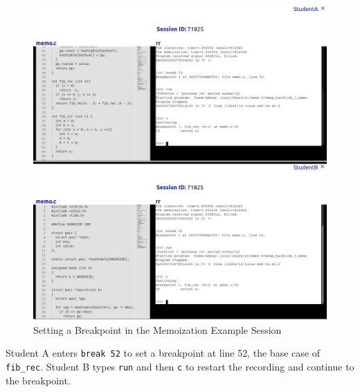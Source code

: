 \documentclass[12pt]{article}
\begin{document}
\begin{figure}[h!]

  \includegraphics[width=\textwidth]{session4i}
  \centering
  \caption{Setting a Breakpoint in the Memoization Example Session}
  \label{session4i}
\end{figure}

Student A enters \lstinline{break 52} to set a breakpoint at line 52,
the base case of \lstinline{fib_rec}.  Student B types \lstinline{run}
and then \lstinline{c} to restart the recording and continue to the
breakpoint.\pagebreak
\end{document}

